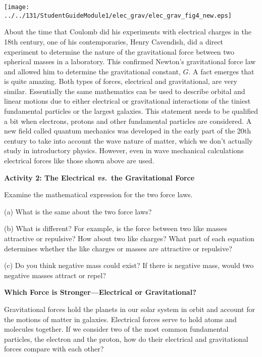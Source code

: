 \vspace{0.3cm}
{\par\centering \texttt{[image: ../../131/StudentGuideModule1/elec\_grav/elec\_grav\_fig4\_new.eps]} \par}
\vspace{0.3cm}

About the time that Coulomb did his experiments with electrical charges in the
18th century, one of his contemporaries, Henry Cavendish, did a direct experiment
to determine the nature of the gravitational force between two spherical masses
in a laboratory. This confirmed Newton's gravitational force law and allowed
him to determine the gravitational constant, $G$. A fact emerges that is quite
amazing. Both types of forces, electrical and gravitational, are very similar.
Essentially the same mathematics can be used to describe orbital and linear
motions due to either electrical or gravitational interactions of the tiniest
fundamental particles or the largest galaxies. This statement needs to be qualified
a bit when electrons, protons and other fundamental particles are considered.
A new field called quantum mechanics was developed in the early part of the 20th
century to take into account the wave nature of matter, which we don't actually
study in introductory physics. However, even in wave mechanical calculations
electrical forces like those shown above are used. 

\textbf{Activity 2: The Electrical \textit{vs.}~the Gravitational Force} 

Examine the mathematical expression for the two force laws.

(a) What is the same about the two force laws?
\answerspace{20mm}

(b) What is different? For example, is the force between two like masses attractive
or repulsive? How about two like charges? What part of each equation determines
whether the like charges or masses are attractive or repulsive?
\answerspace{20mm}

(c) Do you think negative mass could exist? If there is negative mass, would
two negative masses attract or repel?
\answerspace{20mm}

\textbf{Which Force is Stronger---Electrical or Gravitational?} 

Gravitational forces hold the planets in our solar system in orbit and account
for the motions of matter in galaxies. Electrical forces serve to hold atoms
and molecules together. If we consider two of the most common fundamental particles,
the electron and the proton, how do their electrical and gravitational forces
compare with each other?

